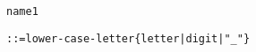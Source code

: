 \begin{alltt}
\hypertarget{name1P\newLinkVer}{name1} ::= lower-case-letter \verb"{"letter | digit | "_"\verb"}"
\end{alltt}
